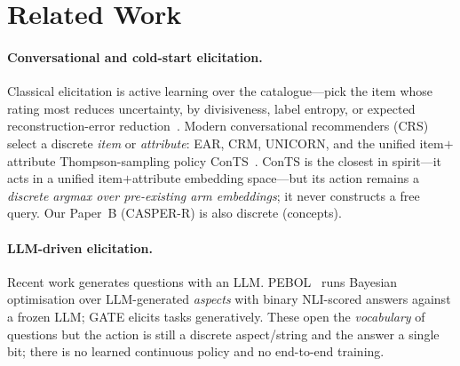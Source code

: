 \documentclass[11pt]{article}
\begin{document}
\section{Related Work}\label{sec:related}
\paragraph{Conversational and cold-start elicitation.} Classical elicitation is active learning over the
catalogue---pick the item whose rating most reduces uncertainty, by divisiveness, label entropy, or expected
reconstruction-error reduction~\cite{rashid,golbandi11,elahi16}. Modern conversational recommenders (CRS) select a
discrete \emph{item} or \emph{attribute}: EAR, CRM, UNICORN, and the unified item$+$attribute Thompson-sampling policy
ConTS~\cite{lei20ear,sun18crm,deng21unicorn,li21conts}. ConTS is the closest in spirit---it acts in a unified
item$+$attribute embedding space---but its action remains a \emph{discrete argmax over pre-existing arm embeddings};
it never constructs a free query. Our Paper~B (CASPER-R) is also discrete (concepts).

\paragraph{LLM-driven elicitation.} Recent work generates questions with an LLM. PEBOL~\cite{pebol} runs Bayesian
optimisation over LLM-generated \emph{aspects} with binary NLI-scored answers against a frozen LLM; GATE elicits tasks
generatively. These open the \emph{vocabulary} of questions but the action is still a discrete aspect/string and the
answer a single bit; there is no learned continuous policy and no end-to-end training.
\end{document}
